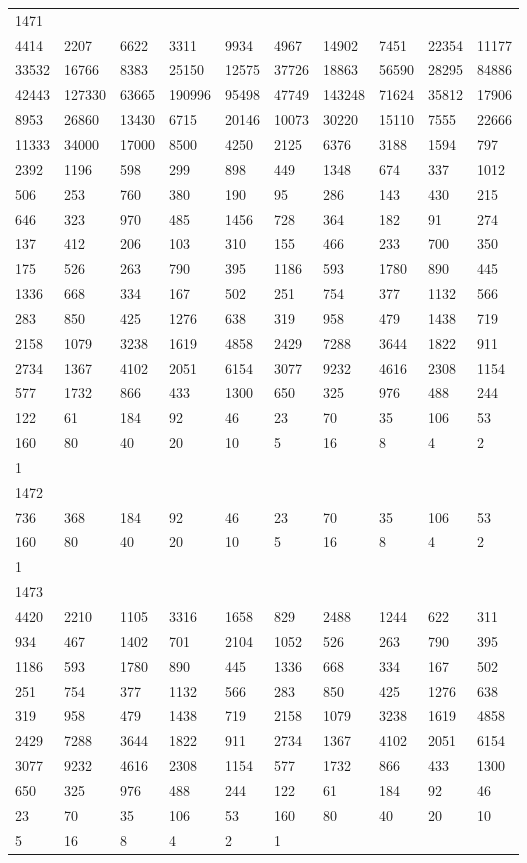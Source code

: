 \begin{longtable}{*{10}{l}}
1471&&&&&&&&&\\
4414& 2207& 6622& 3311& 9934& 4967& 14902& 7451& 22354& 11177\\
33532& 16766& 8383& 25150& 12575& 37726& 18863& 56590& 28295& 84886\\
42443& 127330& 63665& 190996& 95498& 47749& 143248& 71624& 35812& 17906\\
8953& 26860& 13430& 6715& 20146& 10073& 30220& 15110& 7555& 22666\\
11333& 34000& 17000& 8500& 4250& 2125& 6376& 3188& 1594& 797\\
2392& 1196& 598& 299& 898& 449& 1348& 674& 337& 1012\\
506& 253& 760& 380& 190& 95& 286& 143& 430& 215\\
646& 323& 970& 485& 1456& 728& 364& 182& 91& 274\\
137& 412& 206& 103& 310& 155& 466& 233& 700& 350\\
175& 526& 263& 790& 395& 1186& 593& 1780& 890& 445\\
1336& 668& 334& 167& 502& 251& 754& 377& 1132& 566\\
283& 850& 425& 1276& 638& 319& 958& 479& 1438& 719\\
2158& 1079& 3238& 1619& 4858& 2429& 7288& 3644& 1822& 911\\
2734& 1367& 4102& 2051& 6154& 3077& 9232& 4616& 2308& 1154\\
577& 1732& 866& 433& 1300& 650& 325& 976& 488& 244\\
122& 61& 184& 92& 46& 23& 70& 35& 106& 53\\
160& 80& 40& 20& 10& 5& 16& 8& 4& 2\\
1& \\

1472&&&&&&&&&\\
736& 368& 184& 92& 46& 23& 70& 35& 106& 53\\
160& 80& 40& 20& 10& 5& 16& 8& 4& 2\\
1& \\

1473&&&&&&&&&\\
4420& 2210& 1105& 3316& 1658& 829& 2488& 1244& 622& 311\\
934& 467& 1402& 701& 2104& 1052& 526& 263& 790& 395\\
1186& 593& 1780& 890& 445& 1336& 668& 334& 167& 502\\
251& 754& 377& 1132& 566& 283& 850& 425& 1276& 638\\
319& 958& 479& 1438& 719& 2158& 1079& 3238& 1619& 4858\\
2429& 7288& 3644& 1822& 911& 2734& 1367& 4102& 2051& 6154\\
3077& 9232& 4616& 2308& 1154& 577& 1732& 866& 433& 1300\\
650& 325& 976& 488& 244& 122& 61& 184& 92& 46\\
23& 70& 35& 106& 53& 160& 80& 40& 20& 10\\
5& 16& 8& 4& 2& 1& \\


\end{longtable}
